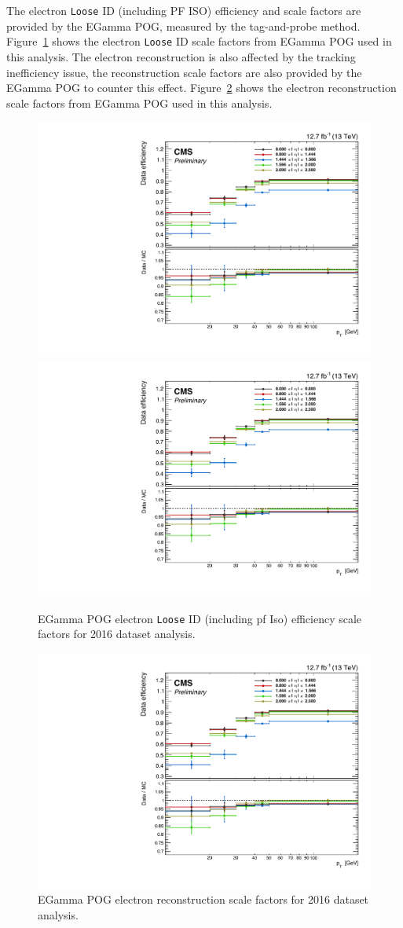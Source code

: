 \vspace{0.3cm}
The electron \texttt{Loose} ID (including PF ISO) efficiency and scale factors are provided by the EGamma POG, measured by the tag-and-probe method. Figure~\ref{fig:bg_eidsf} shows the electron \texttt{Loose} ID scale factors from EGamma POG used in this analysis. The electron reconstruction is also affected by the tracking inefficiency issue, the reconstruction scale factors are also provided by the EGamma POG to counter this effect. Figure~\ref{fig:bg_gsfsf} shows the electron reconstruction scale factors from EGamma POG used in this analysis.  

\begin{figure}[htbp]
\centering
\includegraphics[width=0.66\linewidth, page=1]{figures/bg_elooseideff.pdf}
\includegraphics[width=0.66\linewidth, page=2]{figures/bg_elooseideff.pdf}
\caption{EGamma POG electron \texttt{Loose} ID (including pf Iso) efficiency scale factors for 2016 dataset analysis.}
\label{fig:bg_eidsf}
\end{figure}

\begin{figure}[htbp]
\centering
\includegraphics[width=0.66\linewidth, page=2]{figures/bg_erecoeff.pdf}
\caption{EGamma POG electron reconstruction scale factors for 2016 dataset analysis.}
\label{fig:bg_gsfsf}
\end{figure}

